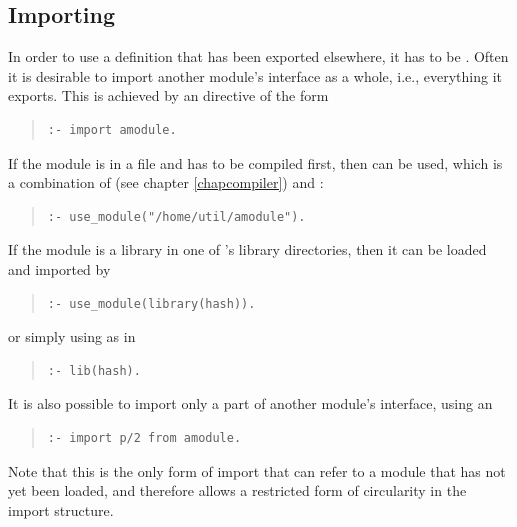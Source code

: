 \subsection{Importing}

In order to use a definition that has been exported elsewhere, it has
to be .  Often it is desirable to import another module's
interface as a whole, i.e., everything it exports.
This is achieved by an
directive of the form
\begin{quote}
\begin{verbatim}
:- import amodule.
\end{verbatim}
\end{quote}
If the module is in a file and has to be compiled first, then
can be used, which is a combination of
(see chapter \ref{chapcompiler}) and
:
\begin{quote}
\begin{verbatim}
:- use_module("/home/util/amodule").
\end{verbatim}
\end{quote}
If the module is a library in one of {\eclipse}'s library directories,
then it can be loaded and imported by
\begin{quote}
\begin{verbatim}
:- use_module(library(hash)).
\end{verbatim}
\end{quote}
or simply using
 as in
\begin{quote}
\begin{verbatim}
:- lib(hash).
\end{verbatim}
\end{quote}

It is also possible to import only a part of another module's
interface, using an
\begin{quote}
\begin{verbatim}
:- import p/2 from amodule.
\end{verbatim}
\end{quote}
Note that this is the only form of import that can refer to a module
that has not yet been loaded, and therefore allows a restricted form
of circularity in the import structure.


